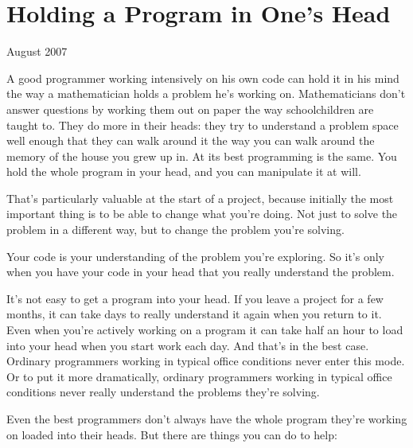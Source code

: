 \chapter{Holding a Program in One's Head}

August 2007

A good programmer working intensively on his own code can hold it in his
mind the way a mathematician holds a problem he's working on.
Mathematicians don't answer questions by working them out on paper the
way schoolchildren are taught to. They do more in their heads: they try
to understand a problem space well enough that they can walk around it
the way you can walk around the memory of the house you grew up in. At
its best programming is the same. You hold the whole program in your
head, and you can manipulate it at will.

That's particularly valuable at the start of a project, because
initially the most important thing is to be able to change what you're
doing. Not just to solve the problem in a different way, but to change
the problem you're solving.

Your code is your understanding of the problem you're exploring. So it's
only when you have your code in your head that you really understand the
problem.

It's not easy to get a program into your head. If you leave a project
for a few months, it can take days to really understand it again when
you return to it. Even when you're actively working on a program it can
take half an hour to load into your head when you start work each day.
And that's in the best case. Ordinary programmers working in typical
office conditions never enter this mode. Or to put it more dramatically,
ordinary programmers working in typical office conditions never really
understand the problems they're solving.

Even the best programmers don't always have the whole program they're
working on loaded into their heads. But there are things you can do to
help:

